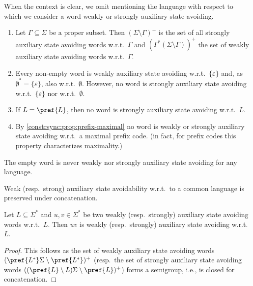 When the context is clear, we omit mentioning the language with respect
to which we consider a word weakly or strongly auxiliary state avoiding.

\begin{example}
\label{constrsync:ex:aux}
\begin{enumerate}
\item  Let $\Gamma \subseteq \Sigma$ be a proper subset.
Then $(\Sigma \setminus \Gamma)^+$ 
is the set of all strongly auxiliary state avoiding
words w.r.t.~$\Gamma$
and $(\Gamma^* ( \Sigma \setminus \Gamma ))^+$
the set of weakly auxiliary state avoiding words w.r.t.~$\Gamma$.

\item Every non-empty word is weakly auxiliary state avoiding w.r.t.~$\{\varepsilon\}$
and, as  $\emptyset^* = \{\varepsilon\}$, also w.r.t.~$\emptyset$.
However, no word is strongly auxiliary state avoiding w.r.t.~$\{\varepsilon\}$
nor w.r.t.~$\emptyset$.

\item If $L = \pref{L}$, then no word is strongly auxiliary state avoiding w.r.t.~$L$.	

\item By \cref{constrsync:prop:prefix-maximal} no word is weakly or strongly auxiliary state avoiding w.r.t.~a maximal
prefix code. (in fact, for prefix codes this property characterizes maximality.)
\end{enumerate} 
\end{example} 

The empty word is never weakly nor strongly auxiliary state avoiding for any language.

Weak (resp.~strong) auxiliary state avoidability w.r.t.~to a common language is preserved
under concatenation.

\begin{proposition}
	\label{constrsync:prop:auxstate-concat}
	Let $L \subseteq \Sigma^*$ and $u,v \in \Sigma^*$ be two weakly (resp.~strongly) auxiliary
	state avoiding words w.r.t.~$L$.
	Then $uv$ is weakly (resp.~strongly) auxiliary state avoiding w.r.t.~$L$.
\end{proposition}
\begin{proof}
	This follows 
	as the set of weakly auxiliary state avoiding words $(\pref{L^*} \Sigma \setminus \pref{L^*})^+$ (resp.~the set of strongly auxiliary state avoiding words $((\pref{L} \setminus L)\Sigma \setminus \pref{L})^+$)
	forms a semigroup, i.e., is closed for concatenation.
\end{proof}

